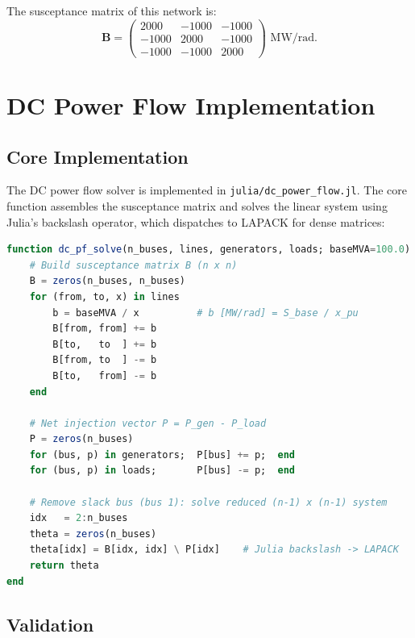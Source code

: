 The susceptance matrix of this network is:
\begin{equation}
    \mathbf{B} = \begin{pmatrix} 2000 & -1000 & -1000 \\ -1000 & 2000 & -1000 \\ -1000 & -1000 & 2000 \end{pmatrix} \text{ MW/rad}.
\end{equation}

\section{DC Power Flow Implementation}

\subsection{Core Implementation}

The DC power flow solver is implemented in \texttt{julia/dc\_power\_flow.jl}. The core function assembles the susceptance matrix and solves the linear system using Julia's backslash operator, which dispatches to LAPACK for dense matrices:

\begin{lstlisting}[language=Julia, caption={DC power flow: susceptance matrix and linear solve}, label={lst:dc_pf_core}]
function dc_pf_solve(n_buses, lines, generators, loads; baseMVA=100.0)
    # Build susceptance matrix B (n x n)
    B = zeros(n_buses, n_buses)
    for (from, to, x) in lines
        b = baseMVA / x          # b [MW/rad] = S_base / x_pu
        B[from, from] += b
        B[to,   to  ] += b
        B[from, to  ] -= b
        B[to,   from] -= b
    end

    # Net injection vector P = P_gen - P_load
    P = zeros(n_buses)
    for (bus, p) in generators;  P[bus] += p;  end
    for (bus, p) in loads;       P[bus] -= p;  end

    # Remove slack bus (bus 1): solve reduced (n-1) x (n-1) system
    idx   = 2:n_buses
    theta = zeros(n_buses)
    theta[idx] = B[idx, idx] \ P[idx]    # Julia backslash -> LAPACK
    return theta
end
\end{lstlisting}

\subsection{Validation}

